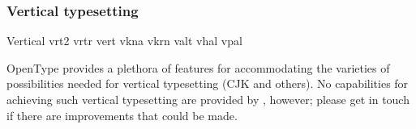 \documentclass[a4paper]{l3doc}
\begin{document}
\subsubsection{Vertical typesetting}

\begin{features}{Vertical}
         {vrt2}
 {vrtr}
            {vert}
        {vkna}
               {vkrn}
      {valt}
           {vhal}
   {vpal}
\end{features}

OpenType provides a plethora of features for accommodating the varieties of possibilities
needed for vertical typesetting (CJK and others).
No capabilities for achieving such vertical typesetting are provided by ,
however; please get in touch if there are improvements that could be made.
\end{document}
